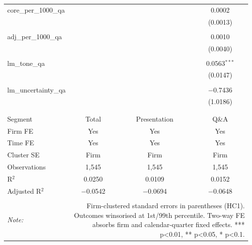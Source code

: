 \begin{table}[!htbp]
\begin{tabular}{@{\extracolsep{5pt}}lccc}
 core\_per\_1000\_qa &  &  & 0.0002 \\ 
  &  &  & (0.0013) \\ 
  & & & \\ 
 adj\_per\_1000\_qa &  &  & 0.0010 \\ 
  &  &  & (0.0040) \\ 
  & & & \\ 
 lm\_tone\_qa &  &  & 0.0563$^{***}$ \\ 
  &  &  & (0.0147) \\ 
  & & & \\ 
 lm\_uncertainty\_qa &  &  & $-$0.7436 \\ 
  &  &  & (1.0186) \\ 
  & & & \\ 
\hline \\[-1.8ex] 
Segment & Total & Presentation & Q\&A \\ 
Firm FE & Yes & Yes & Yes \\ 
Time FE & Yes & Yes & Yes \\ 
Cluster SE & Firm & Firm & Firm \\ 
Observations & 1,545 & 1,545 & 1,545 \\ 
R$^{2}$ & 0.0250 & 0.0109 & 0.0152 \\ 
Adjusted R$^{2}$ & $-$0.0542 & $-$0.0694 & $-$0.0648 \\ 
\hline 
\hline \\[-1.8ex] 
\textit{Note:}  & \multicolumn{3}{r}{Firm-clustered standard errors in parentheses (HC1). Outcomes winsorised at 1st/99th percentile. Two-way FE absorbs firm and calendar-quarter fixed effects. *** p<0.01, ** p<0.05, * p<0.1.} \\ 
\end{tabular} 
\end{table} 
